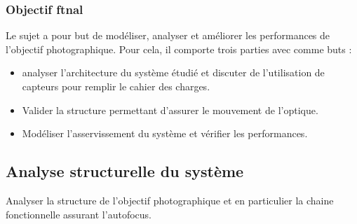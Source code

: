 \subsubsection{Objectif ftnal}\label{objectif-ftnal}

Le sujet a pour but de modéliser, analyser et améliorer les performances
de l'objectif photographique. Pour cela, il comporte trois parties avec
comme buts :


\begin{itemize}
\item analyser l'architecture du système étudié et discuter de l'utilisation de capteurs pour remplir le cahier des charges.
\item Valider la structure permettant d'assurer le mouvement de l'optique.
\item Modéliser l'asservissement du système et vérifier les performances.
\end{itemize}

%


\subsection{Analyse structurelle du système}

\begin{objectif}
Analyser la structure de l'objectif photographique et en particulier la chaine fonctionnelle assurant l'autofocus.
\end{objectif}

